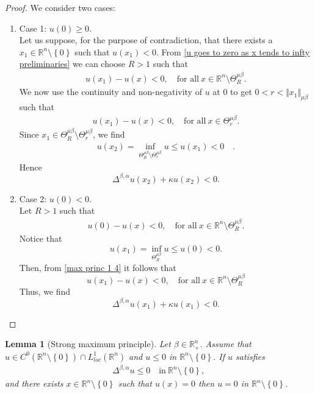 \documentclass[10pt, leqno]{article}
\newtheorem{lemma}[theorem]{Lemma}
\theoremstyle{definition}
\theoremstyle{remark}
\numberwithin{equation}{section}
\begin{document}
\begin{proof}
We consider two cases:
\begin{enumerate}
\item Case 1: $u(0) \geq  0$. \\
Let us suppose, for the purpose of contradiction, that there exists a $x_{1} \in \mathbb{R}^{n} \setminus \left\lbrace 0 \right\rbrace$ such that $u(x_{1}) < 0$. From \eqref{u goes to zero as x tends to infty preliminaries} we can choose $R > 1$ such that
\begin{eqnarray}
\label{max princ 1 1}
u(x_{1}) - u(x) < 0, \quad \text{for all} \ x \in \mathbb{R}^{n} \setminus \Theta^{\mu \beta}_{R}.
\end{eqnarray}
We now use the continuity and non-negativity of $u$ at $0$ to get $0 < r < \Vert x_{1} \Vert_{\mu \beta }$ such that
\begin{eqnarray}
\label{max princ 1 2}
u(x_{1}) - u(x) < 0, \quad \text{for all} \ x \in \Theta^{\mu \beta}_{r}.
\end{eqnarray}
Since $x_{1} \in \Theta^{\mu \beta}_{R} \setminus \Theta^{\mu \beta}_{r}$, we find
\begin{eqnarray}
\label{max princ 1 3}
u(x_{2}) = \inf_{\Theta^{\mu \beta}_{R} \setminus \Theta^{\mu \beta}_{r}} u \leq u(x_{1}) < 0 \quad .
\end{eqnarray}
Hence
$$
\Delta^{\beta, \alpha} u(x_{2}) + \kappa u(x_{2}) < 0.
$$
\item Case 2: $u(0) <0 $. \\
Let $R > 1$ such that
\begin{eqnarray}
\label{max princ 1 4}
u(0) - u(x) < 0, \quad \text{for all} \ x \in \mathbb{R}^{n} \setminus \Theta^{\mu \beta}_{R}.
\end{eqnarray}
Notice that
$$u(x_{1}) = \inf_{\Theta^{\mu \beta}_{R}} u \leq u(0) < 0.$$
Then, from \eqref{max princ 1 4} it follows that
$$
u(x_{1}) - u(x) < 0, \quad \text{for all} \ x \in \mathbb{R}^{n} \setminus \Theta^{\mu \beta}_{R}
$$
Thus, we find
$$
\Delta^{\beta, \alpha} u(x_{1}) + \kappa u(x_{1}) < 0.
$$
\end{enumerate}
\end{proof}

\begin{lemma}[Strong maximum principle]
\label{strong max principle}
Let $\beta \in \mathbb{R}^{n}_{+}$. Assume that $u \in C^{0}_{}\left(\mathbb{R}^{n}\setminus \left\lbrace 0 \right\rbrace \right) \cap L^{1}_{loc}\left(\mathbb{R}^{n}\right)$ and $u \leq 0$ in $\mathbb{R}^{n}\setminus \left\lbrace 0 \right\rbrace$.
If $u$ satisfies
\begin{eqnarray}
\Delta^{\beta, \alpha} u \leq 0 \quad \text{in} \ \mathbb{R}^{n}\setminus \left\lbrace 0 \right\rbrace,
\end{eqnarray}
and there exists $x \in \mathbb{R}^{n}\setminus \left\lbrace 0 \right\rbrace $ such that $u(x) = 0$ then $u = 0$ in $\mathbb{R}^{n}\setminus \left\lbrace 0 \right\rbrace$.
\end{lemma}
\end{document}
